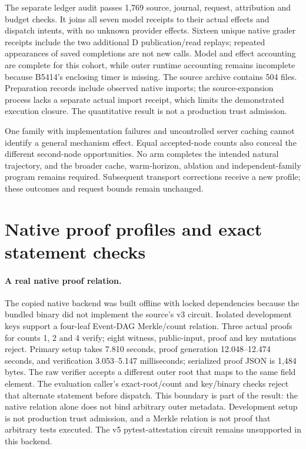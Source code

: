 The separate ledger audit passes 1,769 source, journal, request, attribution and
budget checks. It joins all seven model receipts to their actual effects and
dispatch intents, with no unknown provider effects. Sixteen unique native
grader receipts include the two additional D publication/read replays; repeated
appearances of saved completions are not new calls. Model and effect accounting
are complete for this cohort, while outer runtime accounting remains incomplete
because B5414's enclosing timer is missing. The source archive contains 504
files. Preparation records include observed native imports; the source-expansion
process lacks a separate actual import receipt, which limits the demonstrated
execution closure. The quantitative result is not a production trust admission.

One family with implementation failures and uncontrolled server caching cannot
identify a general mechanism effect. Equal accepted-node counts also conceal
the different second-node opportunities. No arm completes the intended natural
trajectory, and the broader cache, warm-horizon, ablation and independent-family
program remains required. Subsequent transport corrections receive a new profile;
these outcomes and request bounds remain unchanged.

\section{Native proof profiles and exact statement checks}
\label{sec:incremental-native-proof}
\paragraph{A real native proof relation.}
The copied native backend was built offline with locked dependencies because
the bundled binary did not implement the source's v3 circuit. Isolated
development keys support a four-leaf Event-DAG Merkle/count relation. Three
actual proofs for counts 1, 2 and 4 verify; eight witness, public-input,
proof and key mutations reject. Primary setup takes 7.810 seconds,
proof generation 12.048--12.474 seconds, and verification
3.053--5.147 milliseconds; serialized proof JSON is 1,484 bytes.
The raw verifier accepts a different outer root that maps to the same field
element. The evaluation caller's exact-root/count and key/binary checks reject
that alternate statement before dispatch. This boundary is part of the result:
the native relation alone does not bind arbitrary outer metadata. Development
setup is not production trust admission, and a Merkle relation is not proof
that arbitrary tests executed. The v5 pytest-attestation circuit remains
unsupported in this backend.


